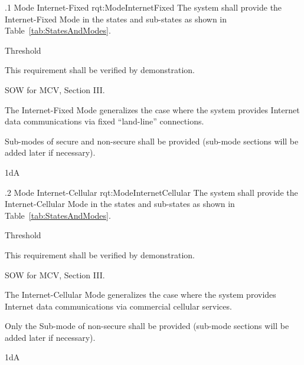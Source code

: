 \ONERQMTVKSA
{\RqtNumberBase.1}
{Mode Internet-Fixed}
{rqt:ModeInternetFixed}
{The system shall provide the Internet-Fixed Mode in the states and sub-states as shown in Table~\ref{tab:StatesAndModes}.}
{
	\item [Phase 1] Threshold
}
{This requirement shall be verified by demonstration.}
{
	\item [\cite{ref:MCV_SOW}] SOW for MCV, Section III.
}
{
	\item The Internet-Fixed Mode generalizes the case where the system provides Internet data communications via fixed ``land-line'' connections.
	\item Sub-modes of secure and non-secure shall be provided (sub-mode sections will be added later if necessary).
}
{1dA}


\ONERQMTVKSA
{\RqtNumberBase.2}
{Mode Internet-Cellular}
{rqt:ModeInternetCellular}
{The system shall provide the Internet-Cellular Mode in the states and sub-states as shown in Table~\ref{tab:StatesAndModes}.}
{
	\item [Phase 1] Threshold
}
{This requirement shall be verified by demonstration.}
{
	\item [\cite{ref:MCV_SOW}] SOW for MCV, Section III.
}
{
	\item The Internet-Cellular Mode generalizes the case where the system provides Internet data communications via commercial cellular services.
	\item Only the Sub-mode of non-secure shall be provided (sub-mode sections will be added later if necessary). 
}
{1dA}



